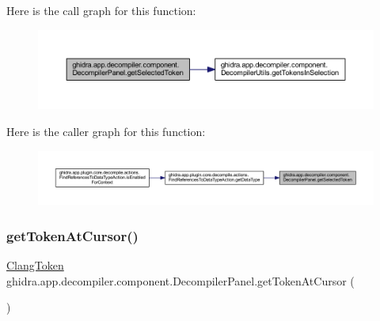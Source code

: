 Here is the call graph for this function\+:
\nopagebreak
\begin{figure}[H]
\begin{center}
\leavevmode
\includegraphics[width=350pt]{classghidra_1_1app_1_1decompiler_1_1component_1_1_decompiler_panel_aedc72ee698aa7fdc9b1b2f892b0fc3db_cgraph}
\end{center}
\end{figure}
Here is the caller graph for this function\+:
\nopagebreak
\begin{figure}[H]
\begin{center}
\leavevmode
\includegraphics[width=350pt]{classghidra_1_1app_1_1decompiler_1_1component_1_1_decompiler_panel_aedc72ee698aa7fdc9b1b2f892b0fc3db_icgraph}
\end{center}
\end{figure}
\mbox{\label{classghidra_1_1app_1_1decompiler_1_1component_1_1_decompiler_panel_a1c849d9b5f8b27ccd7f5cb04404f4dc5}} 
\subsubsection{\texorpdfstring{getTokenAtCursor()}{getTokenAtCursor()}}
{\footnotesize\ttfamily \mbox{\hyperlink{classghidra_1_1app_1_1decompiler_1_1_clang_token}{Clang\+Token}} ghidra.\+app.\+decompiler.\+component.\+Decompiler\+Panel.\+get\+Token\+At\+Cursor (\begin{DoxyParamCaption}{ }\end{DoxyParamCaption})\hspace{0.3cm}{\ttfamily [inline]}}



